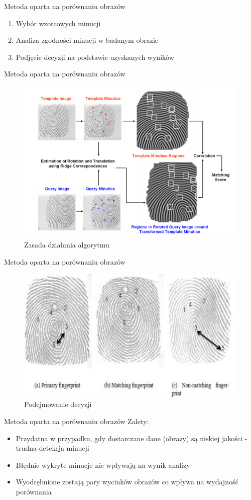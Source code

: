 \documentclass{beamer}
\begin{document}
\begin{frame}{Metoda oparta na porównaniu obrazów}
    \begin{enumerate}
        \item Wybór wzorcowych minucji
        \item Analiza zgodności minucji w badanym obrazie
        \item Podjęcie decyzji na podstawie uzyskanych wyników
    \end{enumerate}
\end{frame}

\begin{frame}{Metoda oparta na porównaniu obrazów}
    \begin{figure}[t]
        \centering
        \includegraphics[width=0.65\linewidth]{algorithms/Correlation_testing.png}
        \caption{Zasada działania algorytmu}
    \end{figure}
\end{frame}

\begin{frame}{Metoda oparta na porównaniu obrazów}
    \begin{figure}[t]
        \centering
        \includegraphics[width=0.65\linewidth]{algorithms/Corelation_distance.png}
        \caption{Podejmowanie decyzji}
    \end{figure}
\end{frame}

\begin{frame}{Metoda oparta na porównaniu obrazów}
    Zalety:
    \begin{itemize}
        \item Przydatna w przypadku, gdy dostarczane dane (obrazy) są niskiej jakości - trudna detekcja minucji
        \item Błędnie wykryte minucje nie wpływają na wynik analizy
        \item Wyodrębnione zostają pary wycinków obrazów co wpływa na wydajność porównania
    \end{itemize}
\end{frame}
\end{document}
